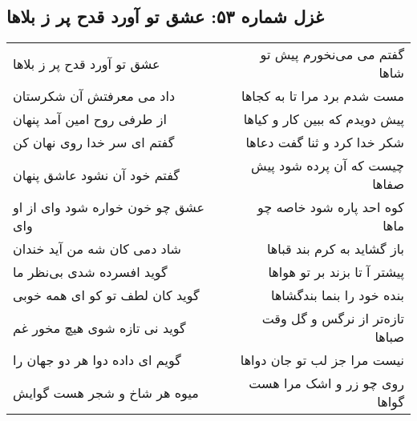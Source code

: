 \begin{center}
\section*{غزل شماره ۵۳: عشق تو آورد قدح پر ز بلاها}
\label{sec:0053}
\begin{longtable}{l p{0.5cm} r}
عشق تو آورد قدح پر ز بلاها
&&
گفتم می می‌نخورم پیش تو شاها
\\
داد می معرفتش آن شکرستان
&&
مست شدم برد مرا تا به کجاها
\\
از طرفی روح امین آمد پنهان
&&
پیش دویدم که ببین کار و کیاها
\\
گفتم ای سر خدا روی نهان کن
&&
شکر خدا کرد و ثنا گفت دعاها
\\
گفتم خود آن نشود عاشق پنهان
&&
چیست که آن پرده شود پیش صفاها
\\
عشق چو خون خواره شود وای از او وای
&&
کوه احد پاره شود خاصه چو ماها
\\
شاد دمی کان شه من آید خندان
&&
باز گشاید به کرم بند قباها
\\
گوید افسرده شدی بی‌نظر ما
&&
پیشتر آ تا بزند بر تو هواها
\\
گوید کان لطف تو کو ای همه خوبی
&&
بنده خود را بنما بندگشاها
\\
گوید نی تازه شوی هیچ مخور غم
&&
تازه‌تر از نرگس و گل وقت صباها
\\
گویم ای داده دوا هر دو جهان را
&&
نیست مرا جز لب تو جان دواها
\\
میوه هر شاخ و شجر هست گوایش
&&
روی چو زر و اشک مرا هست گواها
\\
\end{longtable}
\end{center}
